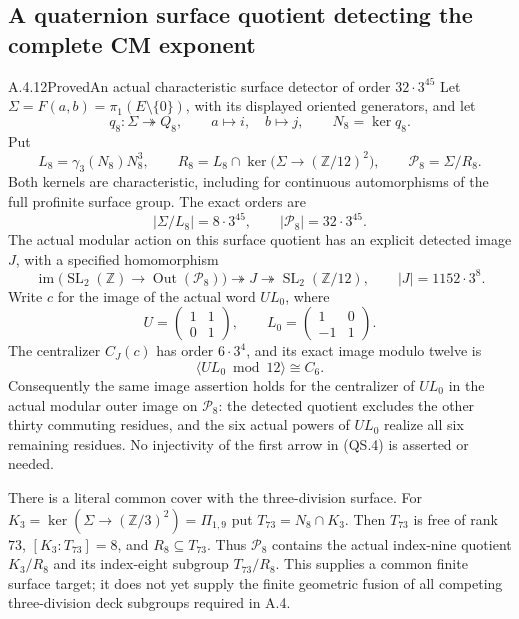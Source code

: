\subsection{A quaternion surface quotient detecting the complete CM exponent}

\begin{result}{A.4.12}{Proved}{An actual characteristic surface detector of order $32\cdot3^{45}$}
Let $\Sigma=F(a,b)=\pi_1(E\setminus\{0\})$, with its displayed
oriented generators, and let
\[
 q_8:\Sigma\twoheadrightarrow Q_8,
 \qquad a\longmapsto i,\quad b\longmapsto j,
 \qquad N_8=\ker q_8.
                                                        \tag{QS.1}
\]
Put
\[
 L_8=\gamma_3(N_8)N_8^3,\qquad
 R_8=L_8\cap\ker\bigl(\Sigma\to(\mathbb Z/12)^2\bigr),
 \qquad \mathcal P_8=\Sigma/R_8.
                                                        \tag{QS.2}
\]
Both kernels are characteristic, including for continuous
automorphisms of the full profinite surface group.  The exact
orders are
\[
 |\Sigma/L_8|=8\cdot3^{45},\qquad
 |\mathcal P_8|=32\cdot3^{45}.
                                                        \tag{QS.3}
\]
The actual modular action on this surface quotient has an
explicit detected image $J$, with a specified homomorphism
\[
 \operatorname{im}\bigl(\operatorname{SL}_2(\mathbb Z)
             \to\operatorname{Out}(\mathcal P_8)\bigr)
       \twoheadrightarrow J
       \twoheadrightarrow\operatorname{SL}_2(\mathbb Z/12),
 \qquad |J|=1152\cdot3^8.
                                                        \tag{QS.4}
\]
Write $c$ for the image of the actual word $UL_0$, where
\[
 U=\begin{pmatrix}1&1\\0&1\end{pmatrix},\qquad
 L_0=\begin{pmatrix}1&0\\-1&1\end{pmatrix}.
\]
The centralizer $C_J(c)$ has order $6\cdot3^4$, and its exact
image modulo twelve is
\[
 \langle UL_0\bmod12\rangle\cong C_6.                    \tag{QS.5}
\]
Consequently the same image assertion holds for the centralizer
of $UL_0$ in the actual modular outer image on
$\mathcal P_8$: the detected quotient excludes the other thirty
commuting residues, and the six actual powers of $UL_0$ realize
all six remaining residues.  No injectivity of the first arrow
in (QS.4) is asserted or needed.

There is a literal common cover with the three-division surface.
For $K_3=\ker(\Sigma\to(\mathbb Z/3)^2)=\Pi_{1,9}$ put
$T_{73}=N_8\cap K_3$.  Then $T_{73}$ is free of rank $73$,
$[K_3:T_{73}]=8$, and $R_8\subseteq T_{73}$.  Thus
$\mathcal P_8$ contains the actual index-nine quotient
$K_3/R_8$ and its index-eight subgroup $T_{73}/R_8$.
This supplies a common finite surface target; it does not yet
supply the finite geometric fusion of all competing
three-division deck subgroups required in A.4.
\end{result}


